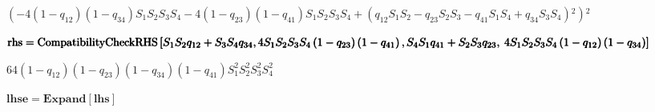 \documentclass{article}
\begin{document}
\begin{doublespace}
\noindent\(\left(-4 \left(1-q_{12}\right) \left(1-q_{34}\right) S_1 S_2 S_3 S_4-4 \left(1-q_{23}\right) \left(1-q_{41}\right) S_1 S_2 S_3 S_4+\left(q_{12}
S_1 S_2-q_{23} S_2 S_3-q_{41} S_1 S_4+q_{34} S_3 S_4\right){}^2\right){}^2\)
\end{doublespace}

\begin{doublespace}
\noindent\(\pmb{\text{rhs} = \text{CompatibilityCheckRHS}\left[S_1S_2q_{12}+S_3S_4q_{34},4S_1S_2S_3S_4\left(1-q_{23}\right)\left(1-q_{41}\right),S_4S_1q_{41}+S_2S_3q_{23},\right.}\\
\pmb{\left.4S_1S_2S_3S_4\left(1-q_{12}\right)\left(1-q_{34}\right)\right]}\)
\end{doublespace}

\begin{doublespace}
\noindent\(64 \left(1-q_{12}\right) \left(1-q_{23}\right) \left(1-q_{34}\right) \left(1-q_{41}\right) S_1^2 S_2^2 S_3^2 S_4^2\)
\end{doublespace}

\begin{doublespace}
\noindent\(\pmb{\text{lhse} = \text{Expand}[\text{lhs}]}\)
\end{doublespace}
\end{document}
